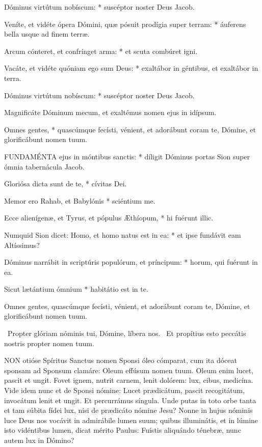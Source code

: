 Dóminus virtútum nobíscum: * suscéptor noster Deus Jacob.

Veníte, et vidéte ópera Dómini, quæ pósuit prodígia super terram: * áuferens bella usque ad finem terræ.

Arcum cónteret, et confrínget arma: * et scuta combúret igni.

Vacáte, et vidéte quóniam ego sum Deus: * exaltábor in géntibus, et exaltábor in terra.

Dóminus virtútum nobíscum: * suscéptor noster Deus Jacob.

 Magnificáte Dóminum mecum, et exaltémus nomen ejus in idípsum.

 Omnes gentes, * quascúmque fecísti, vénient, et adorábunt coram te, Dómine, et glorificábunt nomen tuum.


\lettrine[lines=2]{F}{UNDAMÉNTA} ejus in móntibus sanctis: * díligit Dóminus portas Sion super ómnia tabernácula Jacob.

Gloriósa dicta sunt de te, * cívitas Dei.

Memor ero Rahab, et Babylónis * sciéntium me.

Ecce alienígenæ, et Tyrus, et pópulus Æthíopum, * hi fuérunt illic.

Numquid Sion dicet: Homo, et homo natus est in ea: * et ipse fundávit eam Altíssimus?

Dóminus narrábit in scriptúris populórum, et príncipum: * horum, qui fuérunt in ea.

Sicut lætántium ómnium * habitátio est in te.

 Omnes gentes, quascúmque fecísti, vénient, et adorábunt coram te, Dómine, et glorificábunt nomen tuum.

\V\ Propter glóriam nóminis tui, Dómine, líbera nos. \R\ Et propítius esto peccátis nostris propter nomen tuum.




\lettrine[lines=2]{N}{ON} otióse Spíritus Sanctus nomen Sponsi óleo cómparat, cum ita dóceat sponsam ad Sponsum clamáre: Oleum effúsum nomen tuum. Oleum enim lucet, pascit et ungit. Fovet ignem, nutrit carnem, lenit dolórem: lux, cibus, medicína. Vide idem nunc et de Sponsi nómine: Lucet prædicátum, pascit recogitátum, invocátum lenit et ungit. Et percurrámus síngula. Unde putas in toto orbe tanta et tam súbita fídei lux, nisi de prædicáto nómine Jesu? Nonne in hujus nóminis luce Deus nos vocávit in admirábile lumen suum; quibus illuminátis, et in lúmine isto vidéntibus lumen, dicat mérito Paulus: Fuístis aliquándo ténebræ, nunc autem lux in Dómino?

